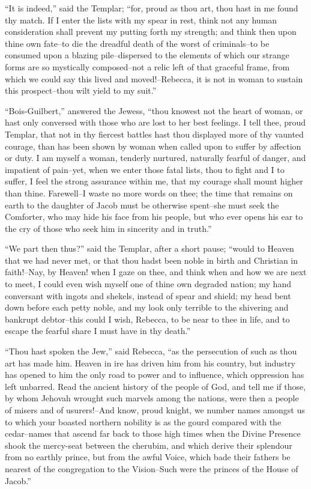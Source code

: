 ``It is indeed,'' said the Templar; ``for, proud as thou art, thou hast
in me found thy match. If I enter the lists with my spear in rest, think
not any human consideration shall prevent my putting forth my strength;
and think then upon thine own fate--to die the dreadful death of the
worst of criminals--to be consumed upon a blazing pile--dispersed to the
elements of which our strange forms are so mystically composed--not a
relic left of that graceful frame, from which we could say this lived
and moved!--Rebecca, it is not in woman to sustain this prospect--thou
wilt yield to my suit.''

``Bois-Guilbert,'' answered the Jewess, ``thou knowest not the heart of
woman, or hast only conversed with those who are lost to her best
feelings. I tell thee, proud Templar, that not in thy fiercest battles
hast thou displayed more of thy vaunted courage, than has been shown by
woman when called upon to suffer by affection or duty. I am myself a
woman, tenderly nurtured, naturally fearful of danger, and impatient of
pain--yet, when we enter those fatal lists, thou to fight and I to
suffer, I feel the strong assurance within me, that my courage shall
mount higher than thine. Farewell--I waste no more words on thee; the
time that remains on earth to the daughter of Jacob must be otherwise
spent--she must seek the Comforter, who may hide his face from his
people, but who ever opens his ear to the cry of those who seek him in
sincerity and in truth.''

``We part then thus?'' said the Templar, after a short pause; ``would to
Heaven that we had never met, or that thou hadst been noble in birth and
Christian in faith!--Nay, by Heaven! when I gaze on thee, and think when
and how we are next to meet, I could even wish myself one of thine own
degraded nation; my hand conversant with ingots and shekels, instead of
spear and shield; my head bent down before each petty noble, and my look
only terrible to the shivering and bankrupt debtor--this could I wish,
Rebecca, to be near to thee in life, and to escape the fearful share I
must have in thy death.''

``Thou hast spoken the Jew,'' said Rebecca, ``as the persecution of such
as thou art has made him. Heaven in ire has driven him from his country,
but industry has opened to him the only road to power and to influence,
which oppression has left unbarred. Read the ancient history of the
people of God, and tell me if those, by whom Jehovah wrought such
marvels among the nations, were then a people of misers and of
usurers!--And know, proud knight, we number names amongst us to which
your boasted northern nobility is as the gourd compared with the
cedar--names that ascend far back to those high times when the Divine
Presence shook the mercy-seat between the cherubim, and which derive
their splendour from no earthly prince, but from the awful Voice, which
bade their fathers be nearest of the congregation to the Vision--Such
were the princes of the House of Jacob.''

